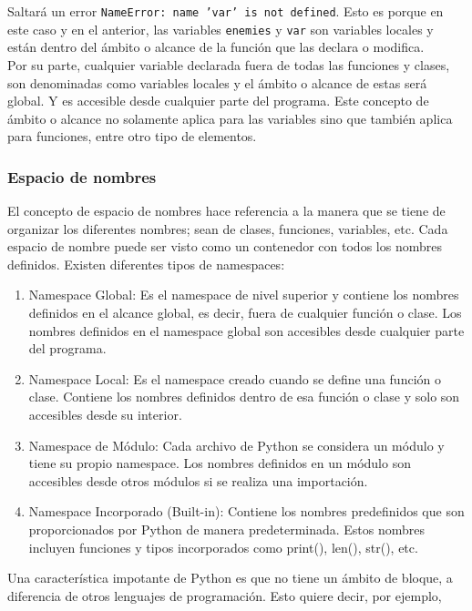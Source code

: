 Saltará un error \texttt{NameError: name 'var' is not defined}. Esto es porque
en este caso y en el anterior, las variables \texttt{enemies} y \texttt{var}
son variables locales y están dentro del ámbito o alcance de la función que las
declara o modifica.\\

Por su parte, cualquier variable declarada fuera de todas las funciones y
clases, son denominadas como variables locales y el ámbito o alcance de estas
será global. Y es accesible desde cualquier parte del programa. Este concepto
de ámbito o alcance no solamente aplica para las variables sino que también
aplica para funciones, entre otro tipo de elementos.

\subsubsection{Espacio de nombres}

El concepto de espacio de nombres hace referencia a la manera que se tiene de
organizar los diferentes nombres; sean de clases, funciones, variables, etc.
Cada espacio de nombre puede ser visto como un contenedor con todos los nombres
definidos. Existen diferentes tipos de namespaces:

\begin{enumerate}
    \item Namespace Global: Es el namespace de nivel superior y contiene los
          nombres definidos en el alcance global, es decir, fuera de cualquier función o
          clase. Los nombres definidos en el namespace global son accesibles desde
          cualquier parte del programa.
    \item Namespace Local: Es el namespace creado cuando se define una función
          o clase. Contiene los nombres definidos dentro de esa función o clase y solo
          son accesibles desde su interior.
    \item Namespace de Módulo: Cada archivo de Python se considera un módulo y
          tiene su propio namespace. Los nombres definidos en un módulo son accesibles
          desde otros módulos si se realiza una importación.
    \item Namespace Incorporado (Built-in): Contiene los nombres predefinidos
          que son proporcionados por Python de manera predeterminada. Estos nombres
          incluyen funciones y tipos incorporados como print(), len(), str(), etc.
\end{enumerate}

Una característica impotante de Python es que no tiene un ámbito de bloque, a
diferencia de otros lenguajes de programación. Esto quiere decir, por ejemplo,

